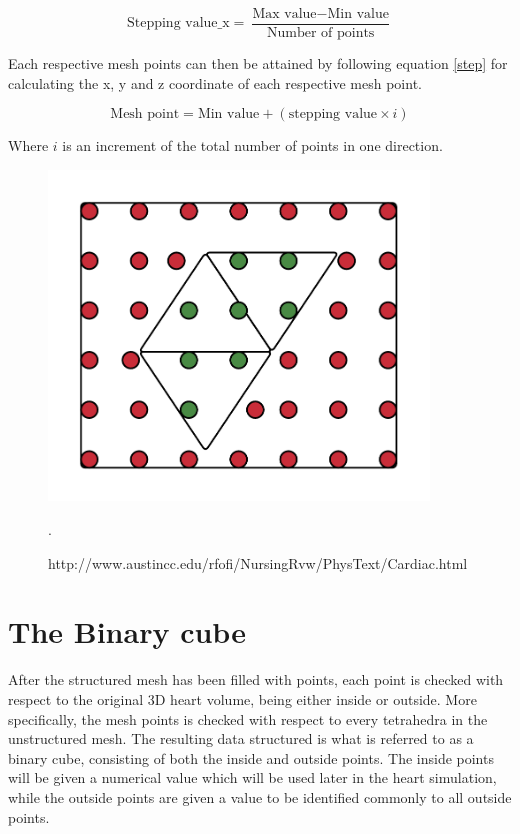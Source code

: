 \begin{equation} \label{step}
\textrm{Stepping value_x} = \frac{\textrm{Max value} - \textrm{Min value}}{\textrm{Number of points}} 
\end{equation}

Each respective mesh points can then be attained by following equation \ref{step} for calculating the x, y and z coordinate of each respective mesh point.

\begin{equation} \label{step}
\textrm{Mesh point} = \textrm{Min value} + (\textrm{stepping value} \times i)
\end{equation}

Where \(i\) is an increment of the total number of points in one direction. 


\begin{figure}[h]
 \centering 
     \includegraphics[width=0.9\textwidth]{bilder/m_points_inside}
     \caption{http://www.austincc.edu/rfofi/NursingRvw/PhysText/Cardiac.html}.
     \label{m_points_inside.png}
\end{figure}


\section{The Binary cube}
After the structured mesh has been filled with points, each point is checked with respect to the original 3D heart volume, being either inside or outside. More specifically, the mesh points is checked with respect to every tetrahedra in the unstructured mesh. The resulting data structured is what is referred to as a binary cube, consisting of both the inside and outside points. The inside points will be given a numerical value which will be used later in the heart simulation, while the outside points are given a value to be identified commonly to all outside points.

